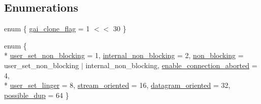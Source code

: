\subsection*{Enumerations}
\begin{DoxyCompactItemize}
\item 
enum \{ \hyperlink{namespaceasio_1_1detail_1_1socket__ops_aa44334e749c196d06de3476edb7691e3a0eac66584d9277444b0f147ff0a14ecc}{gai\+\_\+clone\+\_\+flag} = 1 $<$$<$ 30
 \}
\item 
enum \{ \\*
\hyperlink{namespaceasio_1_1detail_1_1socket__ops_ab89cf85718200744b2fa4e596aff0152a4f960990a3814108246f236f45ef1131}{user\+\_\+set\+\_\+non\+\_\+blocking} = 1, 
\hyperlink{namespaceasio_1_1detail_1_1socket__ops_ab89cf85718200744b2fa4e596aff0152a06ad3be67489f4a19d26607578c69c49}{internal\+\_\+non\+\_\+blocking} = 2, 
\hyperlink{namespaceasio_1_1detail_1_1socket__ops_ab89cf85718200744b2fa4e596aff0152a1c576520ac33d0409afef9d5269a83f1}{non\+\_\+blocking} = user\+\_\+set\+\_\+non\+\_\+blocking $\vert$ internal\+\_\+non\+\_\+blocking, 
\hyperlink{namespaceasio_1_1detail_1_1socket__ops_ab89cf85718200744b2fa4e596aff0152a9528197839697a69b523933325d250f7}{enable\+\_\+connection\+\_\+aborted} = 4, 
\\*
\hyperlink{namespaceasio_1_1detail_1_1socket__ops_ab89cf85718200744b2fa4e596aff0152a1ee8676ef17dc218d9e2a0f3476448e7}{user\+\_\+set\+\_\+linger} = 8, 
\hyperlink{namespaceasio_1_1detail_1_1socket__ops_ab89cf85718200744b2fa4e596aff0152af484931108626a77e56e307a63865d3d}{stream\+\_\+oriented} = 16, 
\hyperlink{namespaceasio_1_1detail_1_1socket__ops_ab89cf85718200744b2fa4e596aff0152a3a888fa7892f325ee0b01b8c98aca55e}{datagram\+\_\+oriented} = 32, 
\hyperlink{namespaceasio_1_1detail_1_1socket__ops_ab89cf85718200744b2fa4e596aff0152a07f9fa89f5d015e7bec396bf41389c21}{possible\+\_\+dup} = 64
 \}
\end{DoxyCompactItemize}
